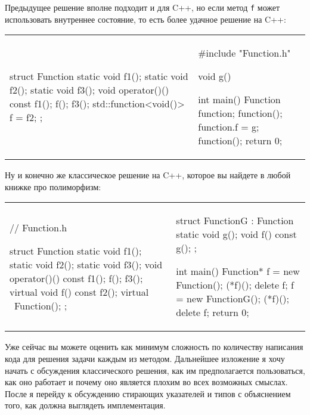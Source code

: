 Предыдущее решение вполне подходит и для C++, но если метод \texttt{f} может использовать внутреннее состояние, то есть более удачное решение на C++:
\begin{center}
\begin{tabular}{ll}
{
\begin{minipage}[\baselineskip]{5.5cm}
\begin{cppcode}[numbers = none, linewidth=5.5cm]
struct Function {
  static void f1();
  static void f2();
  static void f3();
  void operator()() const {
    f1();
    f();
    f3();
  }
  std::function<void()> f = f2;
};
\end{cppcode}
\end{minipage}
}&{
\begin{minipage}[\baselineskip]{5cm}
\begin{cppcode}[numbers = none, linewidth=5cm]
#include "Function.h"

void g() {}

int main() {
  Function function;
  function();
  function.f = g;
  function();
  return 0;
}
\end{cppcode}
\end{minipage}
}
\end{tabular}
\end{center}
Ну и конечно же классическое решение на C++, которое вы найдете в любой книжке про полиморфизм:
\begin{center}
\begin{tabular}{ll}
{
\begin{minipage}[\baselineskip]{5cm}
\begin{cppcode}[numbers = none, linewidth=5cm]
// Function.h

struct Function {
  static void f1();
  static void f2();
  static void f3();
  void operator()() const {
    f1();
    f();
    f3();
  }
  virtual void f() const {
    f2();
  }
  virtual ~Function();
};
\end{cppcode}
\end{minipage}
}&{
\begin{minipage}[\baselineskip]{5.5cm}
\begin{cppcode}[numbers = none, linewidth=5.5cm]
struct FunctionG : Function {
  static void g();
  void f() const {
    g();
  }
};

int main() {
  Function* f = new Function();
  (*f)();
  delete f;
  f = new FunctionG();
  (*f)();
  delete f;
  return 0;
}
\end{cppcode}
\end{minipage}
}
\end{tabular}
\end{center}
Уже сейчас вы можете оценить как минимум сложность по количеству написания кода для решения задачи каждым из методом.
Дальнейшее изложение я хочу начать с обсуждения классического решения, как им предполагается пользоваться, как оно работает и почему оно является плохим во всех возможных смыслах.
После я перейду к обсуждению стирающих указателей и типов с объяснением того, как должна выглядеть имплементация.

